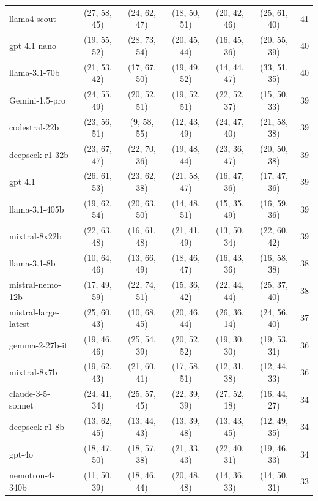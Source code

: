 \documentclass{ieeeaccess}
\begin{document}
\begin{table}[htbp]
{\begin{tabular}{lcccccc}
          llama4-scout & (27, 58, 45) & (24, 62, 47) & (18, 50, 51) & (20, 42, 46) & (25, 61, 40) & 41 \\
          gpt-4.1-nano & (19, 55, 52) & (28, 73, 54) & (20, 45, 44) & (16, 45, 36) & (20, 55, 39) & 40 \\
          llama-3.1-70b & (21, 53, 42) & (17, 67, 50) & (19, 49, 52) & (14, 44, 47) & (33, 51, 35) & 40 \\
          Gemini-1.5-pro & (24, 55, 49) & (20, 52, 51) & (19, 52, 51) & (22, 52, 37) & (15, 50, 33) & 39 \\
          codestral-22b & (23, 56, 51) & (9, 58, 55) & (12, 43, 49) & (24, 47, 40) & (21, 58, 38) & 39 \\
          deepseek-r1-32b & (23, 67, 47) & (22, 70, 36) & (19, 48, 44) & (23, 36, 47) & (20, 50, 38) & 39 \\
          gpt-4.1 & (26, 61, 53) & (23, 62, 38) & (21, 58, 47) & (16, 47, 36) & (17, 47, 36) & 39 \\
          llama-3.1-405b & (19, 62, 54) & (20, 63, 50) & (14, 48, 51) & (15, 35, 49) & (16, 59, 36) & 39 \\
          mixtral-8x22b & (22, 63, 48) & (16, 61, 48) & (21, 41, 49) & (13, 50, 34) & (22, 60, 42) & 39 \\
          llama-3.1-8b & (10, 64, 46) & (13, 66, 49) & (18, 46, 47) & (16, 43, 36) & (16, 58, 38) & 38 \\
          mistral-nemo-12b & (17, 49, 59) & (22, 74, 51) & (15, 36, 42) & (22, 44, 44) & (25, 37, 40) & 38 \\
          mistral-large-latest & (25, 60, 43) & (10, 68, 45) & (20, 46, 44) & (26, 36, 14) & (24, 56, 40) & 37 \\
          gemma-2-27b-it & (19, 46, 46) & (25, 54, 39) & (20, 52, 52) & (19, 30, 30) & (19, 53, 31) & 36 \\
          mixtral-8x7b & (19, 62, 43) & (21, 60, 41) & (17, 58, 51) & (12, 31, 38) & (12, 44, 33) & 36 \\
          claude-3-5-sonnet & (24, 41, 34) & (25, 57, 45) & (22, 39, 39) & (27, 52, 18) & (16, 44, 27) & 34 \\
          deepseek-r1-8b & (13, 62, 45) & (13, 44, 43) & (13, 39, 48) & (13, 43, 45) & (12, 49, 35) & 34 \\
          gpt-4o & (18, 47, 50) & (18, 57, 38) & (21, 33, 43) & (22, 40, 31) & (19, 46, 33) & 34 \\
          nemotron-4-340b & (11, 50, 39) & (18, 46, 44) & (20, 48, 48) & (14, 36, 33) & (14, 50, 31) & 33 \\

\end{tabular}}
\end{table}
\end{document}
